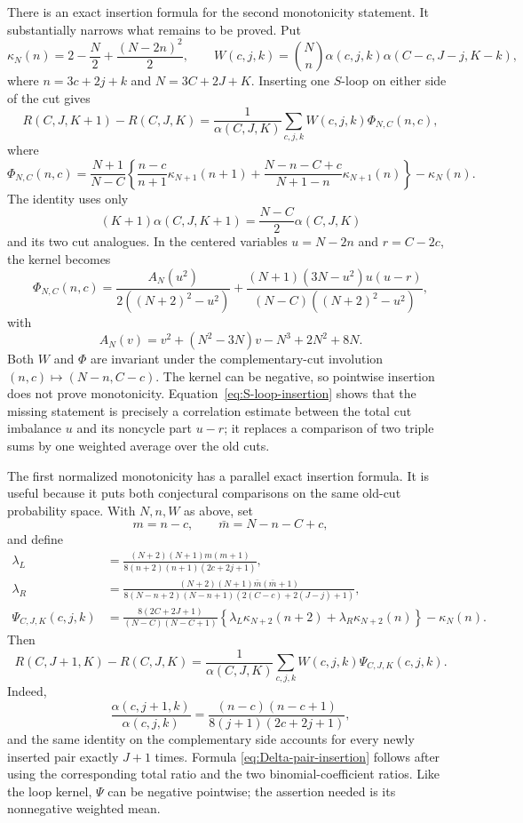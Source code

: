 \documentclass[11pt]{article}
\theoremstyle{remark}
\begin{document}
There is an exact insertion formula for the second monotonicity statement.
It substantially narrows what remains to be proved.  Put
\[
 \kappa_N(n)=2-\frac N2+\frac{(N-2n)^2}{2},\qquad
 W(c,j,k)=\binom Nn\alpha(c,j,k)
 \alpha(C-c,J-j,K-k),
\]
where $n=3c+2j+k$ and $N=3C+2J+K$.  Inserting one $S$-loop on either side
of the cut gives
\begin{equation}\label{eq:S-loop-insertion}
 R(C,J,K+1)-R(C,J,K)
 =\frac1{\alpha(C,J,K)}\sum_{c,j,k}W(c,j,k)\Phi_{N,C}(n,c),
\end{equation}
where
\[
 \Phi_{N,C}(n,c)
 =\frac{N+1}{N-C}\left\{
 \frac{n-c}{n+1}\kappa_{N+1}(n+1)
 +\frac{N-n-C+c}{N+1-n}\kappa_{N+1}(n)
 \right\}-\kappa_N(n).
\]
The identity uses only
\[
 (K+1)\alpha(C,J,K+1)=\frac{N-C}{2}\alpha(C,J,K)
\]
and its two cut analogues.  In the centered variables
$u=N-2n$ and $r=C-2c$, the kernel becomes
\begin{equation}\label{eq:S-loop-centered-kernel}
 \Phi_{N,C}(n,c)=
 \frac{A_N(u^2)}{2((N+2)^2-u^2)}
 +\frac{(N+1)(3N-u^2)u(u-r)}
 {(N-C)((N+2)^2-u^2)},
\end{equation}
with
\[
 A_N(v)=v^2+(N^2-3N)v-N^3+2N^2+8N.
\]
Both $W$ and $\Phi$ are invariant under the complementary-cut involution
$(n,c)\mapsto(N-n,C-c)$.  The kernel can be negative, so pointwise insertion
does not prove monotonicity.  Equation~\eqref{eq:S-loop-insertion} shows that
the missing statement is precisely a correlation estimate between the total
cut imbalance $u$ and its noncycle part $u-r$; it replaces a comparison of
two triple sums by one weighted average over the old cuts.

The first normalized monotonicity has a parallel exact insertion formula.
It is useful because it puts both conjectural comparisons on the same old-cut
probability space.  With $N,n,W$ as above, set
\[
 m=n-c,\qquad \bar m=N-n-C+c,
\]
and define
\begin{align*}
 \lambda_L&=\frac{(N+2)(N+1)m(m+1)}
 {8(n+2)(n+1)(2c+2j+1)},\\
 \lambda_R&=\frac{(N+2)(N+1)\bar m(\bar m+1)}
 {8(N-n+2)(N-n+1)(2(C-c)+2(J-j)+1)},\\
 \Psi_{C,J,K}(c,j,k)
 &=\frac{8(2C+2J+1)}{(N-C)(N-C+1)}
 \left\{\lambda_L\kappa_{N+2}(n+2)
       +\lambda_R\kappa_{N+2}(n)\right\}-\kappa_N(n).
\end{align*}
Then
\begin{equation}\label{eq:Delta-pair-insertion}
 R(C,J+1,K)-R(C,J,K)
 =\frac1{\alpha(C,J,K)}
   \sum_{c,j,k}W(c,j,k)\Psi_{C,J,K}(c,j,k).
\end{equation}
Indeed,
\[
 \frac{\alpha(c,j+1,k)}{\alpha(c,j,k)}
 =\frac{(n-c)(n-c+1)}
 {8(j+1)(2c+2j+1)},
\]
and the same identity on the complementary side accounts for every newly
inserted pair exactly $J+1$ times.  Formula
\eqref{eq:Delta-pair-insertion} follows after using the corresponding total
ratio and the two binomial-coefficient ratios.  Like the loop kernel,
$\Psi$ can be negative pointwise; the assertion needed is its nonnegative
weighted mean.
\end{document}
